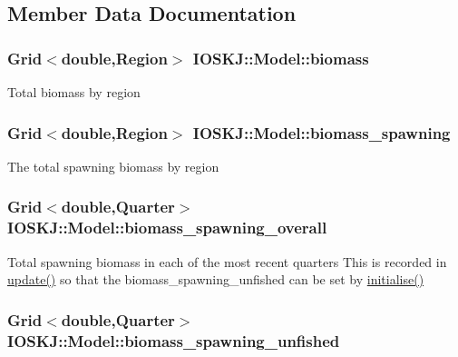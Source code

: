 \subsection{Member Data Documentation}
\hypertarget{classIOSKJ_1_1Model_a8fe11b46a1391ffab784a7e48b6dff3d}{
\subsubsection[{biomass}]{\setlength{\rightskip}{0pt plus 5cm}Grid$<$double,Region$>$ I\-O\-S\-K\-J\-::\-Model\-::biomass}}\label{classIOSKJ_1_1Model_a8fe11b46a1391ffab784a7e48b6dff3d}
Total biomass by region \hypertarget{classIOSKJ_1_1Model_aa39c5fd0a4bdfed3c382ebefe64afafd}{
\subsubsection[{biomass\-\_\-spawning}]{\setlength{\rightskip}{0pt plus 5cm}Grid$<$double,Region$>$ I\-O\-S\-K\-J\-::\-Model\-::biomass\-\_\-spawning}}\label{classIOSKJ_1_1Model_aa39c5fd0a4bdfed3c382ebefe64afafd}
The total spawning biomass by region \hypertarget{classIOSKJ_1_1Model_a8b9aed5a27c23dbe163daac575375560}{
\subsubsection[{biomass\-\_\-spawning\-\_\-overall}]{\setlength{\rightskip}{0pt plus 5cm}Grid$<$double,Quarter$>$ I\-O\-S\-K\-J\-::\-Model\-::biomass\-\_\-spawning\-\_\-overall}}\label{classIOSKJ_1_1Model_a8b9aed5a27c23dbe163daac575375560}
Total spawning biomass in each of the most recent quarters This is recorded in {\ttfamily \hyperlink{classIOSKJ_1_1Model_a5a9a40056b58e0830d7e4fbc349dd900}{update()}} so that the biomass\-\_\-spawning\-\_\-unfished can be set by {\ttfamily \hyperlink{classIOSKJ_1_1Model_ae15f7b02094c380aeec9464d626705fb}{initialise()}} \hypertarget{classIOSKJ_1_1Model_accfa0dcd961f4e5d3a02d390333e4097}{
\subsubsection[{biomass\-\_\-spawning\-\_\-unfished}]{\setlength{\rightskip}{0pt plus 5cm}Grid$<$double,Quarter$>$ I\-O\-S\-K\-J\-::\-Model\-::biomass\-\_\-spawning\-\_\-unfished}}\label{classIOSKJ_1_1Model_accfa0dcd961f4e5d3a02d390333e4097}
